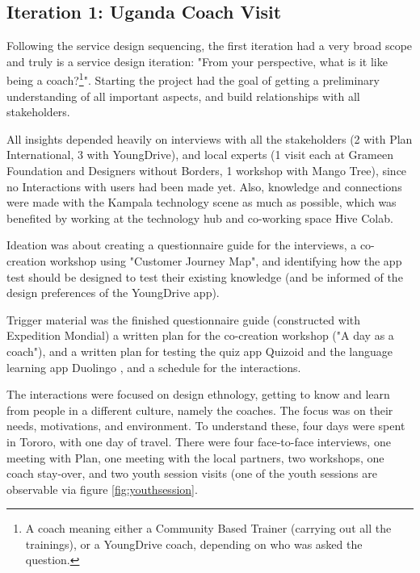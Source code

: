 \subsection{Iteration 1: Uganda Coach Visit}


Following the service design sequencing, the first iteration had a very broad scope and truly is a service design iteration: "From your perspective, what is it like being a coach?\footnote{A coach meaning either a Community Based Trainer (carrying out all the trainings), or a YoungDrive coach, depending on who was asked the question.}". Starting the project had the goal of getting a preliminary understanding of all important aspects, and build relationships with all stakeholders.


All insights depended heavily on interviews with all the stakeholders  (2 with Plan International, 3 with YoungDrive), and local experts (1 visit each at Grameen Foundation and Designers without Borders, 1 workshop with Mango Tree), since no Interactions with users had been made yet. Also, knowledge and connections were made with the Kampala technology scene as much as possible, which was benefited by working at the technology hub and co-working space Hive Colab.

Ideation was about creating a questionnaire guide for the interviews, a co-creation workshop using "Customer Journey Map", and identifying how the app test should be designed to test their existing knowledge (and be informed of the design preferences of the YoungDrive app).

Trigger material was the finished questionnaire guide (constructed with Expedition Mondial) a written plan for the co-creation workshop ("A day as a coach"), and a written plan for testing the quiz app Quizoid \citep{quizoid} and the language learning app Duolingo \citep{duolingo}, and a schedule for the interactions.

The interactions were focused on design ethnology, getting to know and learn from people in a different culture, namely the coaches. The focus was on their needs, motivations, and environment. To understand these, four days were spent in Tororo, with one day of travel. There were four face-to-face interviews,
one meeting with Plan, one meeting with the local partners, two workshops, one coach stay-over, and two youth session visits (one of the youth sessions are observable via figure \ref{fig:youthsession}.

